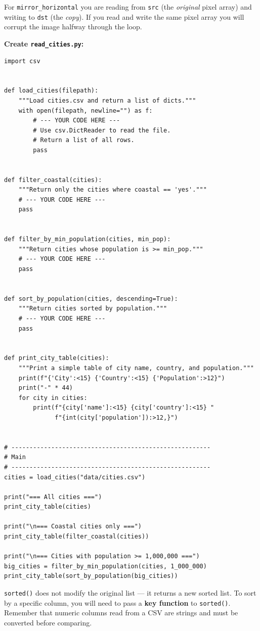 \documentclass{cslab}
\begin{document}
\begin{note}
For \texttt{mirror\_horizontal} you are reading from \texttt{src} (the \emph{original}
pixel array) and writing to \texttt{dst} (the \emph{copy}).  If you read and write the
same pixel array you will corrupt the image halfway through the loop.
\end{note}


\textbf{Create \texttt{read\_cities.py}:}

\begin{lstlisting}
import csv


def load_cities(filepath):
    """Load cities.csv and return a list of dicts."""
    with open(filepath, newline="") as f:
        # --- YOUR CODE HERE ---
        # Use csv.DictReader to read the file.
        # Return a list of all rows.
        pass


def filter_coastal(cities):
    """Return only the cities where coastal == 'yes'."""
    # --- YOUR CODE HERE ---
    pass


def filter_by_min_population(cities, min_pop):
    """Return cities whose population is >= min_pop."""
    # --- YOUR CODE HERE ---
    pass


def sort_by_population(cities, descending=True):
    """Return cities sorted by population."""
    # --- YOUR CODE HERE ---
    pass


def print_city_table(cities):
    """Print a simple table of city name, country, and population."""
    print(f"{'City':<15} {'Country':<15} {'Population':>12}")
    print("-" * 44)
    for city in cities:
        print(f"{city['name']:<15} {city['country']:<15} "
              f"{int(city['population']):>12,}")


# -------------------------------------------------------
# Main
# -------------------------------------------------------
cities = load_cities("data/cities.csv")

print("=== All cities ===")
print_city_table(cities)

print("\n=== Coastal cities only ===")
print_city_table(filter_coastal(cities))

print("\n=== Cities with population >= 1,000,000 ===")
big_cities = filter_by_min_population(cities, 1_000_000)
print_city_table(sort_by_population(big_cities))
\end{lstlisting}

\begin{hint}
\texttt{sorted()} does not modify the original list --- it returns a new sorted list.
To sort by a specific column, you will need to pass a \textbf{key function} to
\texttt{sorted()}.  Remember that numeric columns read from a CSV are strings and
must be converted before comparing.
\end{hint}
\end{document}

